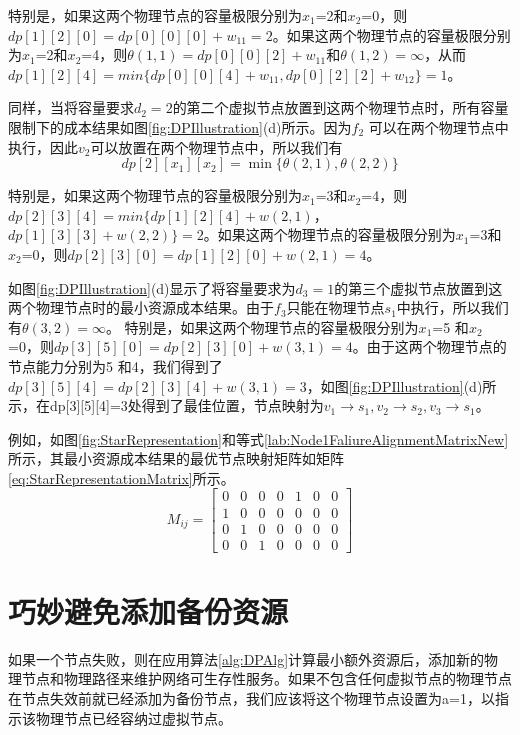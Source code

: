 特别是，如果这两个物理节点的容量极限分别为$x_1$=2和$x_2$=0，则$dp[1][2][0]= dp[0][0][0]+w_{11}=2$。如果这两个物理节点的容量极限分别为$x_1$=2和$x_2$=4，则$\theta (1,1)=dp[0][0][2]+w_{11}$和$\theta (1,2)=\infty$，从而$dp[1][2][4]=min\{ dp[0][0][4]+w_{11}, dp[0][2][2]+w_{12} \}=1$。

同样，当将容量要求$d_2=2$的第二个虚拟节点放置到这两个物理节点时，所有容量限制下的成本结果如图\ref{fig:DPIllustration}(d)所示。因为$f_2$ 可以在两个物理节点中执行，因此$v_2$可以放置在两个物理节点中，所以我们有
\begin{equation}
dp[2][{x_1}][{x_2}] = \min \{\theta (2,1),\theta (2,2)\}
\end{equation}


特别是，如果这两个物理节点的容量极限分别为$x_1$=3和$x_2$=4，则$dp[2][3][4]=min\{dp[1][2][4]+w(2,1)$，$dp[1][3][3]+w(2,2)\}=2$。如果这两个物理节点的容量极限分别为$x_1$=3和$x_2$=0，则$dp[2][3][0]=dp[1][2][0]+w(2,1)=4$。

如图\ref{fig:DPIllustration}(d)显示了将容量要求为$d_3=1$的第三个虚拟节点放置到这两个物理节点时的最小资源成本结果。由于$f_3$只能在物理节点$s_1$中执行，所以我们有$\theta (3,2)=\infty$。 特别是，如果这两个物理节点的容量极限分别为$x_1$=5 和$x_2$=0，则$dp[3][5][0]=dp[2][3][0]+w(3,1)=4$。由于这两个物理节点的节点能力分别为5 和4，我们得到了$dp[3][5][4]=dp[2][3][4]+w(3,1)=3$，如图\ref{fig:DPIllustration}(d)所示，在dp[3][5][4]=3处得到了最佳位置，节点映射为$v_1\rightarrow s_1, v_2\rightarrow s_2, v_3\rightarrow s_1$。

例如，如图\ref{fig:StarRepresentation}和等式\ref{lab:Node1FaliureAlignmentMatrixNew} 所示，其最小资源成本结果的最优节点映射矩阵如矩阵\ref{eq:StarRepresentationMatrix}所示。
\begin{equation}
M_{ij}=\left[ {\begin{array}{*{20}{c}}
0&0&0&0&1&0&0\\
1&0&0&0&0&0&0\\
0&1&0&0&0&0&0\\
0&0&1&0&0&0&0
\end{array}} \right]
\label{eq:StarRepresentationMatrix}
\end{equation}
\section{巧妙避免添加备份资源}
如果一个节点失败，则在应用算法\ref{alg:DPAlg}计算最小额外资源后，添加新的物理节点和物理路径来维护网络可生存性服务。如果不包含任何虚拟节点的物理节点在节点失效前就已经添加为备份节点，我们应该将这个物理节点设置为a=1，以指示该物理节点已经容纳过虚拟节点。

